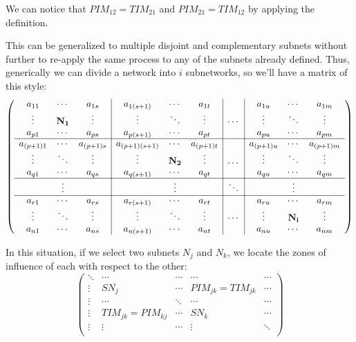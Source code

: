 We can notice that $PIM_{12}=TIM_{21}$ and $PIM_{21}=TIM_{12}$ by applying
the definition.


This can be generalized to multiple disjoint and complementary subnets without further to re-apply the same process to any of the subnets already defined. Thus, generically we can divide a network into $ i $ subnetworks, so we'll have a matrix of this style:
\[
\left(\begin{array}{ccc|ccc|c|ccc}
a_{11} & \cdots & a_{1s} & a_{1(s+1)} & \cdots & a_{1t} &  & a_{1u} & \cdots & a_{1m}\\
\vdots & \mathbf{N_1} & \vdots & \vdots & \ddots & \vdots & \cdots & \vdots & \ddots & \vdots\\
a_{p1} & \cdots & a_{ps} & a_{p(s+1)} & \cdots & a_{pt} &  & a_{pu} & \cdots & a_{pm}\\
\cline{1-10}a_{(p+1)1} & \cdots & a_{(p+1)s} & a_{(p+1)(s+1)} & \cdots & a_{(p+1)t} &  & a_{(p+1)u} & \cdots & a_{(p+1)m}\\
\vdots & \ddots & \vdots & \vdots & \mathbf{N_2} & \vdots & \dots & \vdots & \ddots & \vdots\\
a_{q1} & \cdots & a_{qs} & a_{q(s+1)} & \cdots & a_{qt} &  & a_{qu} & \cdots & a_{qm}\\
\cline{1-10} & \vdots &  &  & \vdots &  & \ddots &  & \vdots\\
\cline{1-10}a_{r1} & \cdots & a_{rs} & a_{r(s+1)} & \cdots & a_{rt} &  & a_{ru} & \cdots & a_{rm}\\
\vdots & \ddots & \vdots & \vdots & \ddots & \vdots & \cdots & \vdots & \mathbf{N_i} & \vdots\\
a_{n1} & \cdots & a_{ns} & a_{n(s+1)} & \cdots & a_{nt} &  & a_{nu} & \cdots & a_{nm}
\end{array}\right)
\]

In this situation, if we select two subnets $ N_ {j} $ and $ N_ {k} $,
we locate the zones of influence of each with respect to the other:
\[
\left(
\begin{array}{c|c|c|c|c}
\ddots & \cdots & \cdots & \cdots & \cdots \\
\hline
\vdots & SN_j & \cdots & PIM_{jk}=TIM_{jk} & \cdots \\
\hline
\vdots & \cdots & \ddots & \cdots & \cdots \\
\hline
\vdots & TIM_{jk}=PIM_{kj} & \cdots & SN_k & \cdots \\
\hline
\vdots & \vdots & \cdots & \vdots & \ddots \\
\end{array}
\right)
\]


